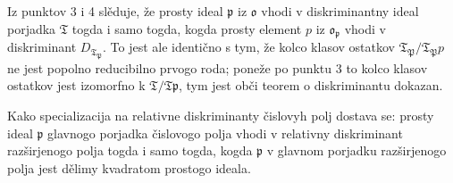 \documentclass[11pt]{article}
\newcommand{\mo}{\mathfrak{o}}
\newcommand{\mT}{\mathfrak{T}}
\newcommand{\mP}{\mathfrak{P}}
\newcommand{\mpideal}{\mathfrak{p}}
\begin{document}
\setcounter{footnote}{39}

\noindent Iz punktov 3 i 4 slěduje, že prosty ideal $\mpideal$ iz $\mo$ vhodi v diskriminantny ideal porjadka $\mT$ togda i samo togda, kogda prosty element $p$ iz $\mo_\mpideal$ vhodi v diskriminant $D_{\mT_\mP}$. To jest ale identično s tym, že kolco klasov ostatkov $\mT_\mP/\mT_\mP p$ ne jest popolno reducibilno prvogo roda; poneže po punktu 3 to kolco klasov ostatkov jest izomorfno k $\mT/\mT\mpideal$, tym jest obči teorem o diskriminantu dokazan.

\noindent Kako specializacija na relativne diskriminanty čislovyh polj dostava se: prosty ideal $\mpideal$ glavnogo porjadka čislovogo polja vhodi v relativny diskriminant razširjenogo polja togda i samo togda, kogda $\mpideal$ v glavnom porjadku razširjenogo polja jest dělimy kvadratom prostogo ideala.
\end{document}
